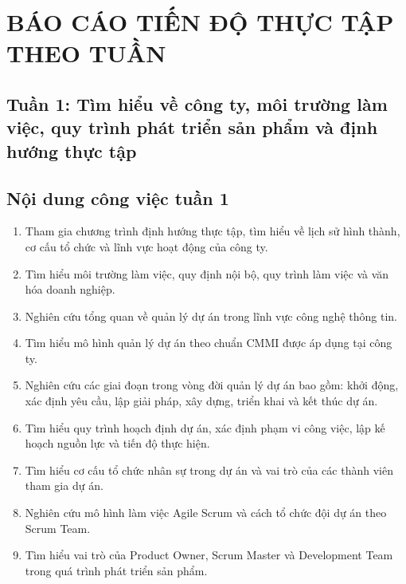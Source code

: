 \section{BÁO CÁO TIẾN ĐỘ THỰC TẬP THEO TUẦN}

\subsection*{Tuần 1: Tìm hiểu về công ty, môi trường làm việc, quy trình phát triển
sản phẩm và định hướng thực tập}

\subsection{Nội dung công việc tuần 1}
\begin{enumerate}[label=\textbf{\arabic*.}, leftmargin=1.2cm]

    \item Tham gia chương trình định hướng thực tập, tìm hiểu về lịch sử hình thành, cơ cấu tổ chức và lĩnh vực hoạt động của công ty.

    \item Tìm hiểu môi trường làm việc, quy định nội bộ, quy trình làm việc và văn hóa doanh nghiệp.

    \item Nghiên cứu tổng quan về quản lý dự án trong lĩnh vực công nghệ thông tin.

    \item Tìm hiểu mô hình quản lý dự án theo chuẩn CMMI được áp dụng tại công ty.

    \item Nghiên cứu các giai đoạn trong vòng đời quản lý dự án bao gồm: khởi động, xác định yêu cầu, lập giải pháp, xây dựng, triển khai và kết thúc dự án.

    \item Tìm hiểu quy trình hoạch định dự án, xác định phạm vi công việc, lập kế hoạch nguồn lực và tiến độ thực hiện.

    \item Tìm hiểu cơ cấu tổ chức nhân sự trong dự án và vai trò của các thành viên tham gia dự án.

    \item Nghiên cứu mô hình làm việc Agile Scrum và cách tổ chức đội dự án theo Scrum Team.

    \item Tìm hiểu vai trò của Product Owner, Scrum Master và Development Team trong quá trình phát triển sản phẩm.


\end{enumerate}
